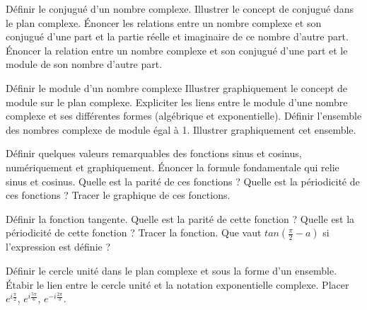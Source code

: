 \begin{exercise}[subtitle=Conjugué d'une nombre complexe, extype=cours]
	\begin{tasks} 
		\task Définir le conjugué d'un nombre complexe.
		\task Illustrer le concept de conjugué dans le plan complexe.
		\task Énoncer les relations entre un nombre complexe et son conjugué d'une part et la partie réelle et imaginaire de ce nombre d'autre part.
		\task Énoncer la relation entre un nombre complexe et son conjugué d'une part et le module de son nombre d'autre part. 
	\end{tasks}
\end{exercise}

\begin{exercise}[subtitle=Module d'un nombre complexe, extype=cours]
	\begin{tasks} 
		\task Définir le module d'un nombre complexe
		\task Illustrer graphiquement le concept de module sur le plan complexe. 
		\task Expliciter les liens entre le module d'une nombre complexe et ses différentes formes (algébrique et exponentielle).
		\task Définir l'ensemble des nombres complexe de module égal à 1. Illustrer graphiquement cet ensemble.
	\end{tasks}
\end{exercise}


\begin{exercise}[subtitle=Fonctions cosinus et sinus, extype=cours]
	\begin{tasks} 
		\task Définir quelques valeurs remarquables des fonctions sinus et cosinus, numériquement et graphiquement.
		\task Énoncer la formule fondamentale qui relie sinus et cosinus.
		\task Quelle est la parité de ces fonctions ?
		\task Quelle est la périodicité de ces fonctions ?
		\task Tracer le graphique de ces fonctions.
	\end{tasks}
\end{exercise}

\begin{exercise}[subtitle=Fonction tangente, extype=cours]
	\begin{tasks} 
		\task Définir la fonction tangente. 
		\task Quelle est la parité de cette fonction ?
		\task Quelle est la périodicité de cette fonction ?
		\task Tracer la fonction.
		\task Que vaut $tan(\frac{\pi}{2}-a)$ si l'expression est définie ?
	\end{tasks}
\end{exercise}

\begin{exercise}[subtitle=Racines nièmes, extype=cours]
	\begin{tasks} 
		\task Définir le cercle unité dans le plan complexe et sous la forme d'un ensemble.
		\task Étabir le lien entre le cercle unité et la notation exponentielle complexe.
		\task Placer $e^{i\frac{\pi}{2}}$, $e^{i\frac{5\pi}{6}}$, $e^{-i\frac{2\pi}{3}}$.
	\end{tasks}
\end{exercise}



